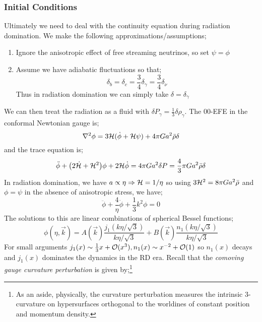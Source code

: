 \subsubsection*{Initial Conditions}
Ultimately we need to deal with the continuity equation during radiation domination. We make the following approximations/assumptions;
\begin{enumerate}
\item Ignore the anisotropic effect of free streaming neutrinos, so set $\psi = \phi$
\item Assume we have adiabatic fluctuations so that;
\begin{equation*}
\delta_b = \delta_c = \frac{3}{4}\delta_\gamma = \frac{3}{4}\delta_\nu
\end{equation*}
Thus in radiation domination we can simply take $\delta = \delta_\gamma$
\end{enumerate}
We can then treat the radiation as a fluid with $\delta P_\gamma = \tfrac{1}{3}\delta \rho_\gamma$. The $00$-EFE in the conformal Newtonian gauge is;
\begin{equation}
\nabla^2 \phi = 3\mathcal{H} (\dot{\phi} + \mathcal{H} \psi) + 4\pi G a^2 \bar{\rho}\delta
\end{equation}
and the trace equation is;
\begin{equation}
\ddot{\phi} + \left(2\dot{\hamilt} + \hamilt^2\right)\phi + 2\hamilt \dot{\phi} = 4\pi Ga^2 \delta P = \frac{4}{3}\pi Ga^2 \bar{\rho}\delta
\end{equation}
In radiation domination, we have $a \propto \eta \Rightarrow \mathcal{H} = 1/\eta$ so using $3\mathcal{H}^2 = 8\pi G a^2 \bar{\rho}$ and $\phi = \psi$ in the absence of anisotropic stress, we have;
\begin{equation*}
\ddot{\phi} + \frac{4}{\eta}\dot{\phi} + \frac{1}{3}k^2 \phi = 0
\end{equation*}
The solutions to this are linear combinations of spherical Bessel functions;
\begin{equation}
\phi(\eta, \vec{k}) = A(\vec{k})\frac{j_1(k\eta / \sqrt{3})}{k\eta / \sqrt{3}} + B(\vec{k})\frac{n_1(k\eta / \sqrt{3})}{k\eta / \sqrt{3}} 
\end{equation}
For small arguments $j_1(x) \sim \tfrac{1}{3}x + \mathcal{O}(x^3), n_1(x) \sim x^{-2} + \mathcal{O}(1)$ so $n_1(x)$ decays and $j_1(x)$ dominates the dynamics in the RD era. Recall that the \emph{comoving gauge curvature perturbation} is given by;\footnote{As an aside, physically, the curvature perturbation measures the intrinsic $3$-curvature on hypersurfaces orthogonal to the worldines of constant position and momentum density.}
